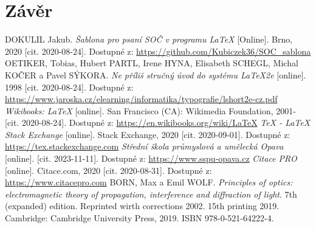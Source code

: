 \documentclass[12pt, a4paper,
twoside,        %
openright
]{report}
\begin{document}
\chapter{Závěr}
		\begin{thebibliography}{99}
		 DOKULIL Jakub. \textit{Šablona pro psaní SOČ v programu \LaTeX} [Online]. Brno, 2020 [cit. 2020-08-24]. Dostupné z: \url{https://github.com/Kubiczek36/SOC_sablona}
		OETIKER, Tobias, Hubert PARTL, Irene HYNA, Elisabeth SCHEGL, Michal KOČER a Pavel SÝKORA. \textit{Ne příliš stručný úvod do systému LaTeX2e} [online]. 1998 [cit. 2020-08-24]. Dostupné z: \url{https://www.jaroska.cz/elearning/informatika/typografie/lshort2e-cz.pdf}
		\textit{Wikibooks: LaTeX} [online]. San Francisco (CA): Wikimedia Foundation, 2001- [cit. 2020-08-24]. Dostupné z: \url{https://en.wikibooks.org/wiki/LaTeX}
		 \textit{TeX - LaTeX Stack Exchange} [online]. Stack Exchange, 2020 [cit. 2020-09-01]. Dostupné z: \url{https://tex.stackexchange.com}
		 \textit{Střední škola průmyslová a umělecká Opava} [online]. [cit. 2023-11-11]. Dostupné z: \url{https://www.sspu-opava.cz}
		\textit{Citace PRO} [online]. Citace.com, 2020 [cit. 2020-08-31]. Dostupné z: \url{https://www.citacepro.com}
		 BORN, Max a Emil WOLF. \textit{Principles of optics: electromagnetic theory of propagation, interference and diffraction of light}. 7th (expanded) edition. Reprinted wirth corrections 2002. 15th printing 2019. Cambridge: Cambridge University Press, 2019. ISBN 978-0-521-64222-4.
	\end{thebibliography}	
\end{document}

